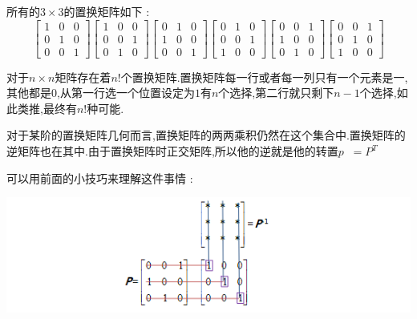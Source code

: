 \documentclass[UTF8,12pt]{ctexbook}
\newcommand{\transpose}{^T}
\DeclareMathOperator{\inverse}{^{-1}}
\begin{document}
{{{{{  所有的$3 \times 3$的置换矩阵如下 :
  $$
    \begin{bmatrix}
      1 & 0 & 0 \\
      0 & 1 & 0 \\
      0 & 0 & 1
    \end{bmatrix}
    \begin{bmatrix}
      1 & 0 & 0 \\
      0 & 0 & 1 \\
      0 & 1 & 0
    \end{bmatrix}
    \begin{bmatrix}
      0 & 1 & 0 \\
      1 & 0 & 0 \\
      0 & 0 & 1
    \end{bmatrix}
    \begin{bmatrix}
      0 & 1 & 0 \\
      0 & 0 & 1 \\
      1 & 0 & 0
    \end{bmatrix}
    \begin{bmatrix}
      0 & 0 & 1 \\
      1 & 0 & 0 \\
      0 & 1 & 0
    \end{bmatrix}
    \begin{bmatrix}
      0 & 0 & 1 \\
      0 & 1 & 0 \\
      1 & 0 & 0
    \end{bmatrix}
  $$

  对于$n \times n$矩阵存在着$n!$个置换矩阵.置换矩阵每一行或者每一列只有一个元素是一,其他都是0,从第一行选一个位置设定为$1$有$n$个选择,第二行就只剩下$n-1$个选择,如此类推,最终有$n!$种可能.

  对于某阶的置换矩阵几何而言,置换矩阵的两两乘积仍然在这个集合中.置换矩阵的逆矩阵也在其中.由于置换矩阵时正交矩阵,所以他的逆就是他的转置$p\inverse = P\transpose$

  可以用前面的小技巧来理解这件事情 :

  \begin{center}
    \includegraphics{resources/permutation_trick_1.png}
  \end{center}

}}}}}
\end{document}
